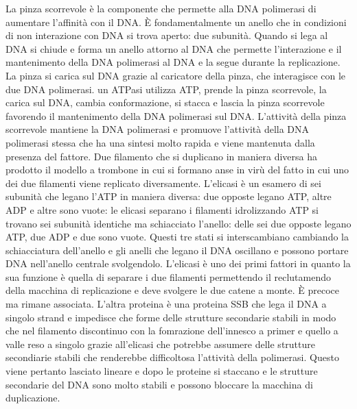 La pinza scorrevole \`e la componente che permette alla DNA polimerasi di aumentare l'affinit\`a con il DNA. \`E fondamentalmente un anello che in condizioni di non interazione con DNA
si trova aperto: due subunit\`a. Quando si lega al DNA si chiude e forma un anello attorno al DNA che permette l'interazione e il mantenimento della DNA polimerasi al DNA e la segue
durante la replicazione. La pinza si carica sul DNA grazie al caricatore della pinza, che interagisce con le due DNA polimerasi. un ATPasi utilizza ATP, prende la pinza scorrevole, la
carica sul DNA, cambia conformazione, si stacca e lascia la pinza scorrevole favorendo il mantenimento  della DNA polimerasi sul DNA. L'attivit\`a della pinza scorrevole mantiene la 
DNA polimerasi e promuove l'attivit\`a della DNA polimerasi stessa che ha una sintesi molto rapida e viene mantenuta dalla presenza del fattore. Due filamento che si duplicano in 
maniera diversa ha prodotto il modello a trombone in cui si formano anse in vir\`u del fatto in cui uno dei due filamenti viene replicato diversamente. L'elicasi \`e un esamero di 
sei subunit\`a che legano l'ATP in maniera diversa: due opposte legano ATP, altre ADP e altre sono vuote: le elicasi separano i filamenti idrolizzando ATP si trovano sei subunit\`a 
identiche ma schiacciato l'anello: delle sei due opposte legano ATP, due ADP e due sono vuote. Questi tre stati si interscambiano cambiando la schiacciatura dell'anello e gli anelli
che legano il DNA oscillano e possono portare DNA nell'anello centrale svolgendolo. L'elicasi \`e uno dei primi fattori in quanto la sua funzione \`e quella di separare i due filamenti
permettendo il reclutamendo della macchina di replicazione e deve svolgere le due catene a monte. \`E precoce ma rimane associata. L'altra proteina \`e una proteina SSB che lega il 
DNA a singolo strand e impedisce che forme delle strutture secondarie stabili in modo che nel filamento discontinuo con la fomrazione dell'innesco a primer e quello a valle reso 
a singolo grazie all'elicasi che potrebbe assumere delle strutture secondiarie stabili che renderebbe difficoltosa l'attivit\`a della polimerasi. Questo viene pertanto lasciato lineare
e dopo le proteine si staccano e le strutture secondarie del DNA sono molto stabili e possono bloccare la macchina di duplicazione. 

